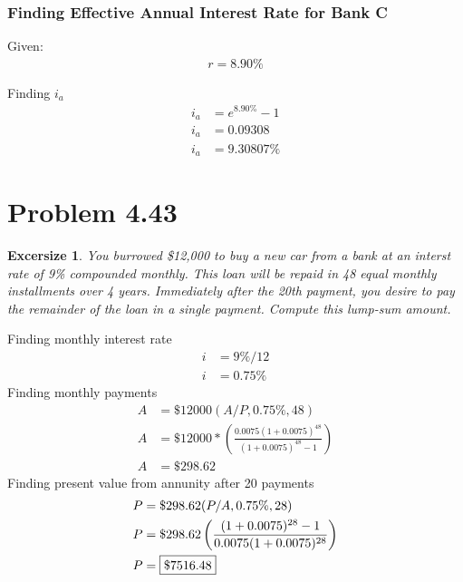 \documentclass[../INDE250HW.tex]{subfiles}
\newtheorem{exrc}{Excersize}
\begin{document}
\subsubsection*{Finding Effective Annual Interest Rate for Bank C}
Given:
\begin{equation*}
    \begin{aligned}
        r = 8.90\%
    \end{aligned}
\end{equation*}

\noindent
Finding $i_a$
\begin{equation*}
    \begin{aligned}
        i_a &= e^{8.90\%} - 1 \\
        i_a &= 0.09308 \\
        i_a &= 9.30807\%
    \end{aligned}
\end{equation*}
\section*{Problem 4.43}
\begin{exrc}
    You burrowed \$12,000 to buy a new car from a bank at an interst rate of 9\% compounded monthly. This loan will be repaid in 48 equal monthly installments over 4 years. Immediately after the 20th payment, you desire to pay the remainder of the loan in a single payment. Compute this lump-sum amount.
\end{exrc}
Finding monthly interest rate
\begin{equation*}
    \begin{aligned}
        i &= 9\%/12 \\
        i &= 0.75\%
    \end{aligned}
\end{equation*}
Finding monthly payments 
\begin{equation*}
    \begin{aligned}
        A &= \$12000(A/P, 0.75\%, 48) \\
        A &= \$12000*\left(\frac{0.0075(1+0.0075)^{48}}{(1+0.0075)^{48}-1}\right) \\
        A &= \$298.62
    \end{aligned}
\end{equation*}
Finding present value from annunity after 20 payments
\begin{equation*}
    \begin{aligned}
        P &= \$298.62(P/A,0.75\%,28) \\
        P &= \$298.62\left(\frac{(1+0.0075)^{28}-1}{0.0075(1+0.0075)^{28}}\right) \\
        P &= \framebox{$\$7516.48$}
    \end{aligned}
\end{equation*}
\end{document}
